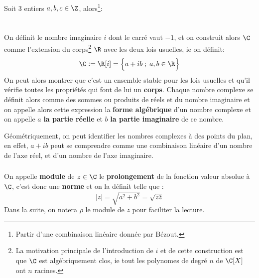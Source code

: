 \subsection*{}
Soit 3 entiers \(a, b, c \in \Z\), alors\footnote[1]{Partir d'une combinaison linéaire donnée par Bézout.}:

\chapter*{} %

On définit le nombre imaginaire \(i\) dont le carré vaut \(-1\), et on construit alors \(\C\) comme l'extension du corps\footnote[1]{La motivation principale de l'introduction de \(i\) et de cette construction est que \(\C\) est algébriquement clos, ie tout les polynomes de degré \(n\) de \(\C[X]\) ont \(n\) racines.} \(\R\) avec les deux lois usuelles, ie on définit:
\[
   \C := \R[i] = \Bigl\{a + ib \; ; \; a, b \in \R \Bigl\}
\]
On peut alors montrer que c'est un ensemble stable pour les lois usuelles et qu'il vérifie toutes les propriétés qui font de lui un \textbf{corps}.\+
Chaque nombre complexe se définit alors comme des sommes ou produits de réels et du nombre imaginaire et on appelle alors cette expression la \textbf{forme algébrique} d'un nombre complexe et on appelle \(a\) \textbf{la partie réelle} et \(b\) \textbf{la partie imaginaire} de ce nombre. \<

Géométriquement, on peut identifier les nombres complexes à des points du plan, en effet, \(a + ib\) peut se comprendre comme une combinaison linéaire d'un nombre de l'axe réel, et d'un nombre de l'axe imaginaire.

\subsection*{}
On appelle \textbf{module} de \(z \in \C\) le \textbf{prolongement} de la fonction valeur absolue à \(\C\), c'est donc une \textbf{norme} et on la définit telle que {:}
\[
   |z| = \sqrt{a^2 + b^2} = \sqrt{z\overline{z}} 
\]
Dans la suite, on notera \(\rho\) le module de \(z\) pour faciliter la lecture.


